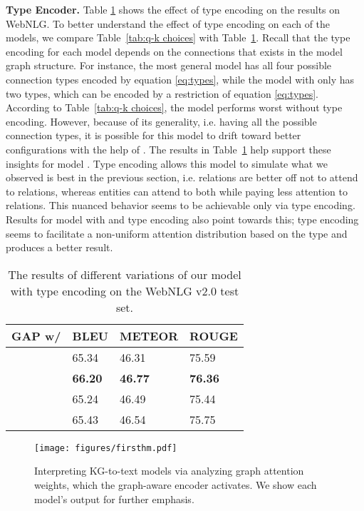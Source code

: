\documentclass[11pt]{article}
\begin{document}
\noindent\textbf{Type Encoder.} Table \ref{tab:type-enc} shows the effect of type encoding on the results on WebNLG. To better understand the effect of type encoding on each of the models, we compare Table~\ref{tab:q-k choices} with Table~\ref{tab:type-enc}. Recall that the type encoding  for each model depends on the connections that exists in the model graph structure. For instance, the most general model  has all four possible connection types encoded by equation \eqref{eq:types}, while the model with  only has two types, which can be encoded by a restriction of equation \eqref{eq:types}. According to Table~\ref{tab:q-k choices}, the model  performs worst without type encoding. However, because of its generality, i.e. having all the possible connection types, it is possible for this model to drift toward better configurations with the help of . The results in Table~\ref{tab:type-enc} help support these insights for model . Type encoding allows this model to simulate what we observed is best in the previous section, i.e. relations are better off not to attend to relations, whereas entities can attend to both while paying less attention to relations. This nuanced behavior seems to be achievable only via type encoding. Results for model with  and type encoding also point towards this; type encoding seems to facilitate a non-uniform attention distribution based on the type and produces a better result.

\begin{table}[]
\centering
\begin{tabular}{llll}
\hline
GAP w/  & BLEU  & METEOR & ROUGE \\ \hline
 & 65.34 & 46.31 & 75.59 \\ \hline
 &  \textbf{66.20}  &   \textbf{46.77}    &   \textbf{76.36}    \\ \hline
 &    65.24   &    46.49   &   75.44    \\ \hline
 & 65.43 & 46.54 & 75.75 \\ \hline
\end{tabular}
\caption{\label{tab:type-enc} The results of different variations of our model with type encoding on the WebNLG v2.0 test set.}
\end{table}

\begin{figure*}[t]
\centering
\texttt{[image: figures/firsthm.pdf]}
\caption{Interpreting KG-to-text models via analyzing graph attention weights, which the graph-aware encoder activates. We show each model's output for further emphasis.}
\label{fig:heatmap}
\end{figure*}
\end{document}
